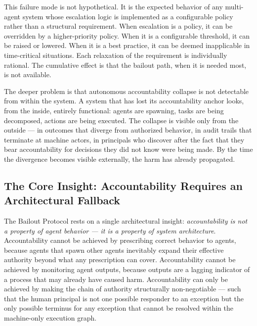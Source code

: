 This failure mode is not hypothetical. It is the expected behavior of any multi-agent system whose escalation logic is implemented as a configurable policy rather than a structural requirement. When escalation is a policy, it can be overridden by a higher-priority policy. When it is a configurable threshold, it can be raised or lowered. When it is a best practice, it can be deemed inapplicable in time-critical situations. Each relaxation of the requirement is individually rational. The cumulative effect is that the bailout path, when it is needed most, is not available.

The deeper problem is that autonomous accountability collapse is not detectable from within the system. A system that has lost its accountability anchor looks, from the inside, entirely functional: agents are spawning, tasks are being decomposed, actions are being executed. The collapse is visible only from the outside — in outcomes that diverge from authorized behavior, in audit trails that terminate at machine actors, in principals who discover after the fact that they bear accountability for decisions they did not know were being made. By the time the divergence becomes visible externally, the harm has already propagated.

\subsection{The Core Insight: Accountability Requires an Architectural Fallback}

The Bailout Protocol rests on a single architectural insight: \emph{accountability is not a property of agent behavior — it is a property of system architecture}. Accountability cannot be achieved by prescribing correct behavior to agents, because agents that spawn other agents inevitably expand their effective authority beyond what any prescription can cover. Accountability cannot be achieved by monitoring agent outputs, because outputs are a lagging indicator of a process that may already have caused harm. Accountability can only be achieved by making the chain of authority structurally non-negotiable — such that the human principal is not one possible responder to an exception but the only possible terminus for any exception that cannot be resolved within the machine-only execution graph.

